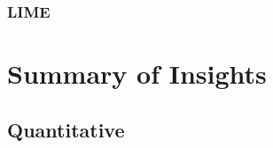\documentclass[main]{subfiles}
\begin{document}
\subsubsection{LIME}



\section{Summary of Insights}
\subsection{Quantitative}
\end{document}
